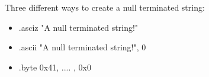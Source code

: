 \documentclass{article}
\begin{document}
\noindent Three different ways to create a null terminated string:
\begin{itemize}
\Item .string "A null terminated string!"
\item .asciz "A null terminated string!"
\item .ascii "A null terminated string!", 0
\item .byte 0x41, .... , 0x0
\end{itemize}
\end{document}
